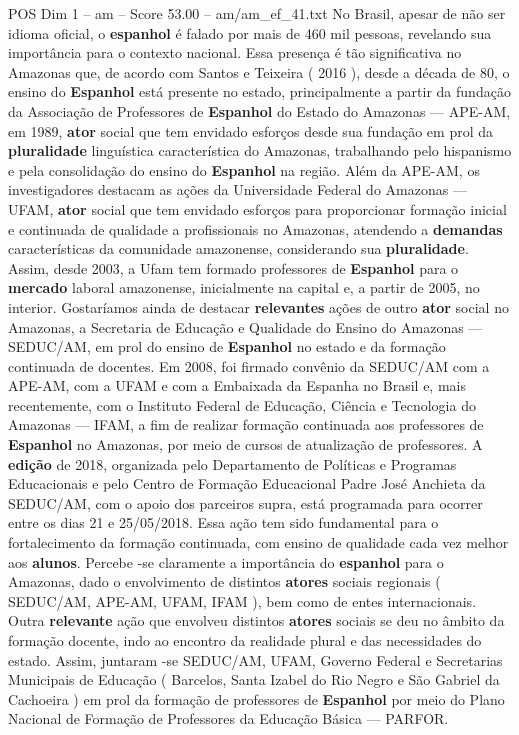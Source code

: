 \begin{textsample}{POS Dim 1 – am – Score 53.00 – am/am\_ef\_41.txt}
No Brasil, apesar de não ser idioma oficial, o \textbf{espanhol} é falado por mais de 460 mil pessoas, revelando sua importância para o contexto nacional.
Essa presença é tão significativa no Amazonas que, de acordo com Santos e Teixeira ( 2016 ), desde a década de 80, o ensino do \textbf{Espanhol} está presente no estado, principalmente a partir da fundação da Associação de Professores de \textbf{Espanhol} do Estado do Amazonas — APE-AM, em 1989, \textbf{ator} social que tem envidado esforços desde sua fundação em prol da \textbf{pluralidade} linguística característica do Amazonas, trabalhando pelo hispanismo e pela consolidação do ensino do \textbf{Espanhol} na região.
Além da APE-AM, os investigadores destacam as ações da Universidade Federal do Amazonas — UFAM, \textbf{ator} social que tem envidado esforços para proporcionar formação inicial e continuada de qualidade a profissionais no Amazonas, atendendo a \textbf{demandas} características da comunidade amazonense, considerando sua \textbf{pluralidade}.
Assim, desde 2003, a Ufam tem formado professores de \textbf{Espanhol} para o \textbf{mercado} laboral amazonense, inicialmente na capital e, a partir de 2005, no interior.
Gostaríamos ainda de destacar \textbf{relevantes} ações de outro \textbf{ator} social no Amazonas, a Secretaria de Educação e Qualidade do Ensino do Amazonas — SEDUC/AM, em prol do ensino de \textbf{Espanhol} no estado e da formação continuada de docentes.
Em 2008, foi firmado convênio da SEDUC/AM com a APE-AM, com a UFAM e com a Embaixada da Espanha no Brasil e, mais recentemente, com o Instituto Federal de Educação, Ciência e Tecnologia do Amazonas — IFAM, a fim de realizar formação continuada aos professores de \textbf{Espanhol} no Amazonas, por meio de cursos de atualização de professores.
A \textbf{edição} de 2018, organizada pelo Departamento de Políticas e Programas Educacionais e pelo Centro de Formação Educacional Padre José Anchieta da SEDUC/AM, com o apoio dos parceiros supra, está programada para ocorrer entre os dias 21 e 25/05/2018.
Essa ação tem sido fundamental para o fortalecimento da formação continuada, com ensino de qualidade cada vez melhor aos \textbf{alunos}.
Percebe -se claramente a importância do \textbf{espanhol} para o Amazonas, dado o envolvimento de distintos \textbf{atores} sociais regionais ( SEDUC/AM, APE-AM, UFAM, IFAM ), bem como de entes internacionais.
Outra \textbf{relevante} ação que envolveu distintos \textbf{atores} sociais se deu no âmbito da formação docente, indo ao encontro da realidade plural e das necessidades do estado.
Assim, juntaram -se SEDUC/AM, UFAM, Governo Federal e Secretarias Municipais de Educação ( Barcelos, Santa Izabel do Rio Negro e São Gabriel da Cachoeira ) em prol da formação de professores de \textbf{Espanhol} por meio do Plano Nacional de Formação de Professores da Educação Básica — PARFOR.

\end{textsample}
